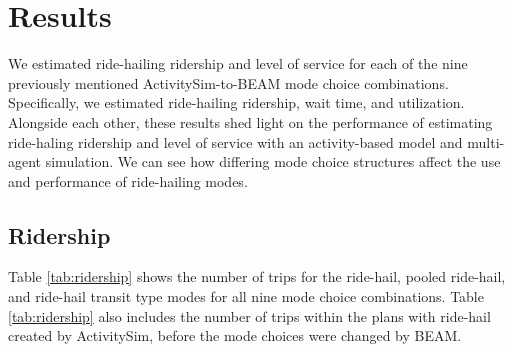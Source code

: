 \documentclass[fancy, masters]{byuthesis}
\begin{document}
\hypertarget{results}{%
\chapter{Results}\label{results}}

We estimated ride-hailing ridership and level of service for each of the nine previously mentioned ActivitySim-to-BEAM mode choice combinations. Specifically, we estimated ride-hailing ridership, wait time, and utilization. Alongside each other, these results shed light on the performance of estimating ride-haling ridership and level of service with an activity-based model and multi-agent simulation. We can see how differing mode choice structures affect the use and performance of ride-hailing modes.

\hypertarget{res-ridership}{%
\section{Ridership}\label{res-ridership}}

Table \ref{tab:ridership} shows the number of trips for the ride-hail, pooled ride-hail, and ride-hail transit type modes for all nine mode choice combinations. Table \ref{tab:ridership} also includes the number of trips within the plans with ride-hail created by ActivitySim, before the mode choices were changed by BEAM.
\end{document}
